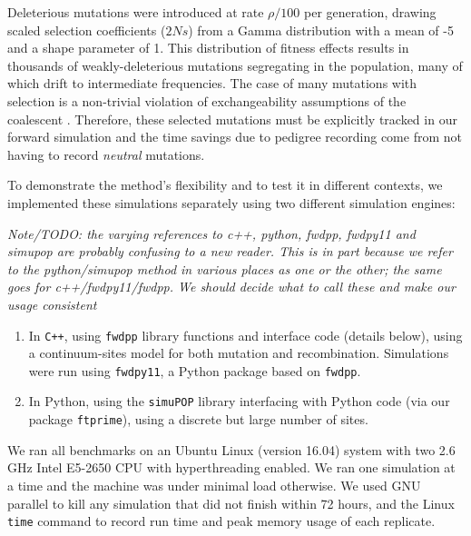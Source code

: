 \documentclass{article}
\newcommand{\simupop}{\texttt{simuPOP}}
\newcommand{\fwdpp}{\texttt{fwdpp}}
\newcommand{\fwdpy}{\texttt{fwdpy11}}
\newcommand{\cpp}{\texttt{C++}}
\newcommand{\ftprime}{\texttt{ftprime}}
\newcommand{\jda}[1]{{\em \color{cyan} #1}}
\begin{document}
Deleterious mutations were introduced at rate $\rho/100$ per generation, drawing scaled selection
coefficients ($2Ns$)
from a Gamma distribution with a mean of -5 and a shape parameter of 1.  This distribution of fitness effects results in
thousands of weakly-deleterious mutations segregating in the population, many of which drift to intermediate
frequencies.  The case of many mutations with selection is a non-trivial violation of exchangeability assumptions of the
coalescent \citep{Neuhauser1997-nn}.  Therefore, these selected mutations must be explicitly tracked in our forward simulation
and the time savings due to pedigree recording come from not having to record \textit{neutral} mutations.

To demonstrate the method's flexibility and to test it in different contexts,
we implemented these simulations separately using two different simulation engines:

\jda{Note/TODO: the varying references to c++, python, fwdpp, fwdpy11 and
	simupop are probably confusing to a new reader. This is in part because
	we refer to the python/simupop method in various places as one or the
	other; the same goes for c++/fwdpy11/fwdpp. We should decide what to
	call these and make our usage consistent}

\begin{enumerate}

    \item
        In \cpp{}, using \fwdpp{} library functions and interface code (details below),
        using a continuum-sites model for both mutation and recombination. Simulations were run using \fwdpy{}, a Python
        package based on \fwdpp.

    \item
        In Python, using the \simupop{} library interfacing with Python code
	(via our package \ftprime{}),
        using a discrete but large number of sites.

\end{enumerate}

We ran all benchmarks on an Ubuntu Linux (version 16.04) system with two 2.6 GHz Intel E5-2650 CPU with
hyperthreading enabled.
We ran one simulation at a time and the machine was under minimal load otherwise.
We used GNU parallel \citep{Tange2011a} to kill any simulation that did not finish within 72 hours,
and the Linux \texttt{time} command to record run time and peak memory usage of each replicate.
\end{document}
